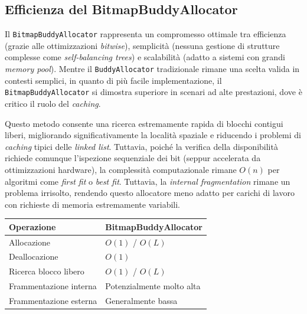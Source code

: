 \subsection*{Efficienza del BitmapBuddyAllocator}
Il \texttt{BitmapBuddyAllocator} rappresenta un compromesso ottimale tra efficienza (grazie alle ottimizzazioni \textit{bitwise}), semplicità (nessuna gestione di strutture complesse come \textit{self-balancing trees}) e scalabilità (adatto a sistemi con grandi \textit{memory pool}). Mentre il \texttt{BuddyAllocator} tradizionale rimane una scelta valida in contesti semplici, in quanto di più facile implementazione, il \texttt{BitmapBuddyAllocator} si dimostra superiore in scenari ad alte prestazioni, dove è critico il ruolo del \textit{caching}. 

Questo metodo consente una ricerca estremamente rapida di blocchi contigui liberi, migliorando significativamente la località spaziale e riducendo i problemi di \textit{caching} tipici delle \textit{linked list}. Tuttavia, poiché la verifica della disponibilità richiede comunque l’ispezione sequenziale dei bit (seppur accelerata da ottimizzazioni hardware), la complessità computazionale rimane $O(n)$ per algoritmi come \textit{first fit} o \textit{best fit}. Tuttavia, la \textit{internal fragmentation} rimane un problema irrisolto, rendendo questo allocatore meno adatto per carichi di lavoro con richieste di memoria estremamente variabili.

\begin{center}
\begin{tabular}{|l|l|}
\hline
Operazione & BitmapBuddyAllocator \\
\hline
Allocazione & $O(1)$ / $O(L)$ \\
Deallocazione & $O(1)$ \\
Ricerca blocco libero & $O(1)$ / $O(L)$ \\
Frammentazione interna & Potenzialmente molto alta \\
Frammentazione esterna & Generalmente bassa \\
\hline
\end{tabular}
\end{center}
